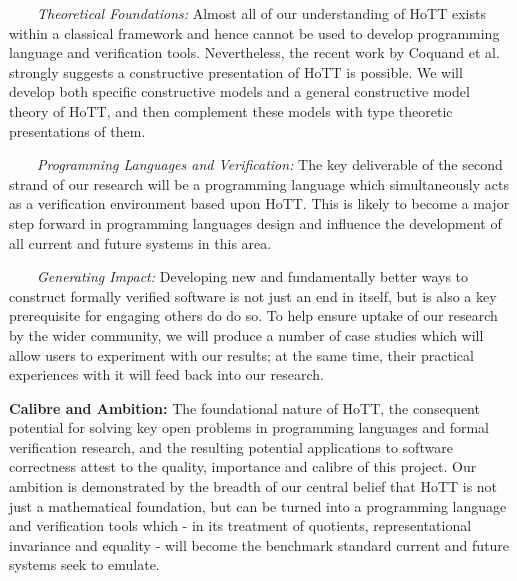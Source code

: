 \documentclass[a4paper,11pt]{article}
\begin{document}



$\;\;\; \;\;\;$ {\em Theoretical Foundations:} Almost all of our understanding
  of HoTT exists within a classical framework and hence cannot be used
  to develop programming language and verification tools. Nevertheless, the recent
  work by Coquand et al. strongly suggests a constructive presentation of HoTT
  is possible. We will develop both specific constructive models
  and a general constructive model theory of HoTT, and then complement
  these models with type theoretic presentations of them.

$\;\;\;\;\;\;$ {\em Programming Languages and Verification:} The key
  deliverable of the second strand of our research will be a
  programming language which simultaneously acts as a verification
  environment based upon HoTT. This is likely to become a major
  step forward in programming languages design and influence
  the development of all current and future systems in this area.

$\;\;\;\;\;\;$ {\em Generating Impact:} Developing new and fundamentally
  better ways to construct formally verified software is not just an
  end in itself, but is also a key prerequisite for engaging others do
  do so.  To help ensure uptake of our research by the wider
  community, we will produce a number of case studies which will allow
  users to experiment with our results; at the same time, their
  practical experiences with it will feed back into our research.

{\bf Calibre and Ambition:} The foundational nature of HoTT, the
consequent potential for solving key open problems in programming
languages and formal verification research, and the resulting
potential applications to software correctness attest to the quality,
importance and calibre of this project. Our ambition is demonstrated by the
breadth of our central belief that HoTT is not just a mathematical
foundation, but can be turned into a programming
language and verification tools which - in its treatment of
quotients, representational invariance and equality - will become the
benchmark standard current and future systems seek to
emulate.
\end{document}
